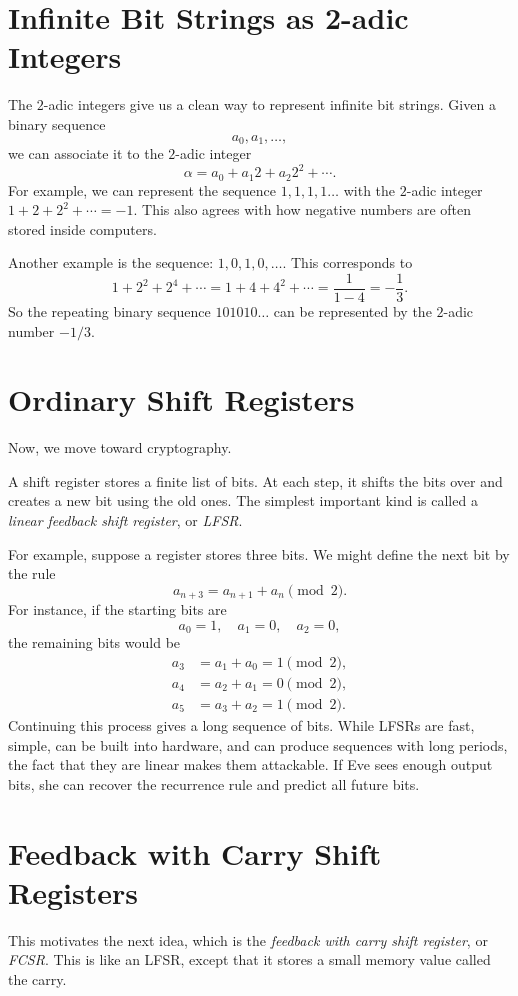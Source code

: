 \documentclass[12pt]{amsart}
\theoremstyle{plain}
\theoremstyle{definition}
\theoremstyle{remark}
\begin{document}
\section{Infinite Bit Strings as 2-adic Integers}
The $2$-adic integers give us a clean way to represent infinite bit strings. Given a binary sequence
$$a_0, a_1, \ldots,$$
we can associate it to the $2$-adic integer
$$\alpha = a_0 + a_1 2 + a_2 2^2 + \cdots.$$
For example, we can represent the sequence $1, 1, 1, 1 \ldots$ with the $2$-adic integer $1 + 2 + 2^2 + \cdots = -1$. This also agrees with how negative numbers are often stored inside computers.

Another example is the sequence: $1, 0, 1, 0, \ldots$. This corresponds to
$$1 + 2^2 + 2^4 + \cdots = 1 + 4 + 4^2 + \cdots = \frac{1}{1 - 4} = -\frac{1}{3}.$$
So the repeating binary sequence $101010\ldots$ can be represented by the $2$-adic number $-1/3$.

\section{Ordinary Shift Registers}
Now, we move toward cryptography.

A shift register stores a finite list of bits. At each step, it shifts the bits over and creates a new bit using the old ones. The simplest important kind is called a \emph{linear feedback shift register}, or \emph{LFSR}.

For example, suppose a register stores three bits. We might define the next bit by the rule
$$a_{n + 3} = a_{n + 1} + a_n \pmod{2}.$$
For instance, if the starting bits are
$$a_0 = 1, \quad a_1 = 0, \quad a_2 = 0,$$
the remaining bits would be
\begin{align*}
a_3 &= a_1 + a_0 = 1 \pmod{2}, \\
a_4 &= a_2 + a_1 = 0 \pmod{2}, \\
a_5 &= a_3 + a_2 = 1 \pmod{2}.
\end{align*}
Continuing this process gives a long sequence of bits. While LFSRs are fast, simple, can be built into hardware, and can produce sequences with long periods, the fact that they are linear makes them attackable. If Eve sees enough output bits, she can recover the recurrence rule and predict all future bits.

\section{Feedback with Carry Shift Registers}
This motivates the next idea, which is the \emph{feedback with carry shift register}, or \emph{FCSR}. This is like an LFSR, except that it stores a small memory value called the carry.
\end{document}
